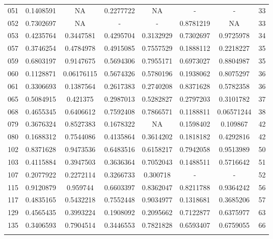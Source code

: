 \begin{anexosenv}
\begin{table}[H]
{\begin{tabular}{cccccccc}
051 & 0.1408591 & NA & 0.2277722 & NA & - & - &  33 \\ 
052 & 0.7302697 & NA & - & - &  0.8781219 & NA & 33 \\ 
053 & 0.4235764 & 0.3447581 & 0.4295704 & 0.3132929 & 0.7302697 & 0.9725978 & 34 \\ 
057 & 0.3746254 & 0.4784978 & 0.4915085 & 0.7557529 & 0.1888112 & 0.2218227 & 35 \\ 
059 & 0.6803197 & 0.9147675 & 0.5694306 & 0.7955171 & 0.6973027 & 0.8804987 & 35 \\ 
060 & 0.1128871 & 0.06176115 & 0.5674326 & 0.5780196 & 0.1938062 & 0.8075297 & 36 \\ 
061 & 0.3306693 & 0.1387564 & 0.2617383 & 0.2740208 & 0.8371628 & 0.5782358 & 36 \\ 
065 & 0.5084915 & 0.421375 & 0.2987013 & 0.5282827 & 0.2797203 & 0.3101782 & 37 \\ 
068 & 0.4655345 & 0.6406612 & 0.7592408 & 0.7866571 & 0.1188811 & 0.06571244 & 38 \\ 
079 & 0.3676324 & 0.8527383 & 0.1678322 & NA & 0.1598402 & 0.109867 & 42 \\ 
080 & 0.1688312 & 0.7544086 & 0.4135864 & 0.3614202 & 0.1818182 & 0.4292816 & 42 \\ 
102 & 0.8371628 & 0.9473536 & 0.6483516 & 0.6158217 & 0.7942058 & 0.9513989 & 50 \\ 
103 & 0.4115884 & 0.3947503 & 0.3636364 & 0.7052043 & 0.1488511 & 0.5716642 & 51 \\ 
107 & 0.2077922 & 0.2272114 & 0.3266733 & 0.300718 & - & - &  52 \\ 
115 & 0.9120879 & 0.959744 & 0.6603397 & 0.8362047 & 0.8211788 & 0.9364242 & 56 \\ 
117 & 0.4835165 & 0.5432218 & 0.7552448 & 0.9034977 & 0.1318681 & 0.3685206 & 57 \\ 
129 & 0.4565435 & 0.3993224 & 0.1908092 & 0.2095662 & 0.7122877 & 0.6375977 & 63 \\ 
135 & 0.3406593 & 0.7904514 & 0.3446553 & 0.7821828 & 0.6593407 & 0.6759055 & 66 \\ \hline                        
\label{tab:sorinorotation4}
\end{tabular}
}
\end{table}


\end{anexosenv}
